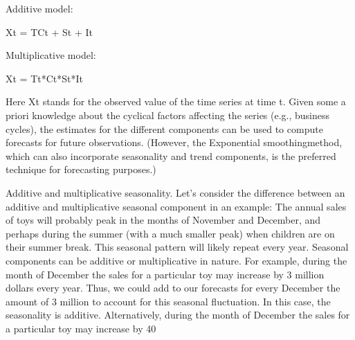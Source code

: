 Additive model:

Xt = TCt + St + It

Multiplicative model:

Xt = Tt*Ct*St*It

Here Xt stands for the observed value of the time series at time t. Given some a priori knowledge about the cyclical factors affecting the series (e.g., business cycles), the estimates for the different components can be used to compute forecasts for future observations. (However, the Exponential smoothingmethod, which can also incorporate seasonality and trend components, is the preferred technique for forecasting purposes.)

Additive and multiplicative seasonality. Let's consider the difference between an additive and multiplicative seasonal component in an example: The annual sales of toys will probably peak in the months of November and December, and perhaps during the summer (with a much smaller peak) when children are on their summer break. This seasonal pattern will likely repeat every year. Seasonal components can be additive or multiplicative in nature. For example, during the month of December the sales for a particular toy may increase by 3 million dollars every year. Thus, we could add to our forecasts for every December the amount of 3 million to account for this seasonal fluctuation. In this case, the seasonality is additive. Alternatively, during the month of December the sales for a particular toy may increase by 40%

